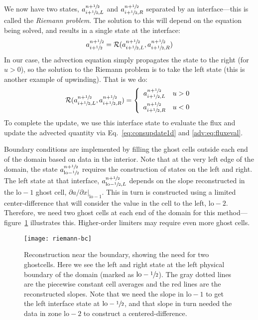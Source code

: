 We now have two states, $a_{i+{\sfrac{1}{2}},L}^{n+{\sfrac{1}{2}}}$ and
$a_{i+{\sfrac{1}{2}},R}^{n+{\sfrac{1}{2}}}$ separated by an interface---this is
called the {\em Riemann problem}.
%
The solution to this will depend on the equation being solved, and
results in a single state at the interface:
\begin{equation}
a_{i+{\sfrac{1}{2}}}^{n+{\sfrac{1}{2}}} = \mathcal{R}(a_{i+{\sfrac{1}{2}},L}^{n+{\sfrac{1}{2}}},a_{i+{\sfrac{1}{2}},R}^{n+{\sfrac{1}{2}}})
\end{equation}
In our case, the advection equation simply propagates the state to the
right (for $u > 0$), so the solution to the Riemann problem is to take
the left state (this is another example of upwinding).  That is we do:
\begin{equation}
\mathcal{R}(a_{i+{\sfrac{1}{2}},L}^{n+{\sfrac{1}{2}}},a_{i+{\sfrac{1}{2}},R}^{n+{\sfrac{1}{2}}}) = \left \{ \begin{array}{ccc} a_{i+{\sfrac{1}{2}},L}^{n+{\sfrac{1}{2}}} & u > 0 \\[2mm] a_{i+{\sfrac{1}{2}},R}^{n+{\sfrac{1}{2}}} & u < 0 \end{array} \right .
\label{eq:riemannsolve}
\end{equation}
To complete the update, we use this interface state to evaluate the
flux and update the advected quantity via Eq.~\ref{eq:consupdate1d}
and \ref{adv:eq:fluxeval}.

Boundary conditions are implemented by filling the ghost cells outside
each end of the domain based on data in the interior.  Note that at
the very left edge of the domain, the state
$a^{n+{\sfrac{1}{2}}}_{\mathrm{lo}-{\sfrac{1}{2}}}$ requires the construction of states on
the left and right.  The left state at that interface,
$a^{n+{\sfrac{1}{2}}}_{\mathrm{lo}-{\sfrac{1}{2}},L}$ depends on the slope reconstructed in
the $\mathrm{lo}-1$ ghost cell, $\partial a/\partial x
|_{\mathrm{lo}-1}$.  This in turn is constructed using a limited
center-difference that will consider the value in the cell to the
left, $\mathrm{lo-2}$.  Therefore, we need two ghost cells at each end
of the domain for this method---figure~\ref{fig:advect_ghost}
illustrates this.  Higher-order limiters may require even more ghost
cells.

\begin{figure}[t]
\centering
\texttt{[image: riemann-bc]}
\caption[Reconstruction at the domain boundary]
        {\label{fig:advect_ghost} Reconstruction near the boundary,
          showing the need for two ghostcells.  Here we see the left
          and right state at the left physical boundary of the domain
          (marked as $\mathrm{lo}-{\sfrac{1}{2}}$).  The gray dotted lines
          are the piecewise constant cell averages and the red lines
          are the reconstructed slopes.  Note that we need the slope
          in $\mathrm{lo}-1$ to get the left interface state at
          $\mathrm{lo}-{\sfrac{1}{2}}$, and that slope in turn needed the
          data in zone $\mathrm{lo}-2$ to construct a
          centered-difference.}
\end{figure}


